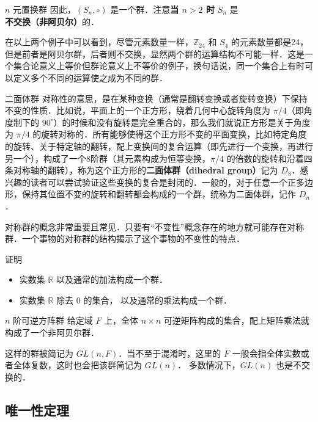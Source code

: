 \begin{example}{$n$ 元置换群}
因此，$(S_n, \circ)$ 是一个群．注意\textbf{当 $n>2$ 时} $S_n$ 是\textbf{不交换（非阿贝尔）}的．
\end{example}

在以上两个例子中可以看到，尽管元素数量一样，$\mathbb{Z}_{24}$ 和 $S_4$ 的元素数量都是24，但是前者是阿贝尔群，后者则不交换，显然两个群的运算结构不可能一样．这是一个集合论意义上等价但群论意义上不等价的例子，换句话说，同一个集合上有时可以定义多个不同的运算使之成为不同的群．

\begin{example}{二面体群}\label{Group_ex4}
对称性的意思，是在某种变换（通常是翻转变换或者旋转变换）下保持不变的性质．比如说，平面上的一个正方形，绕着几何中心旋转角度为 $\pi/4$（即角度制下的 $90^\circ$）的时候和没有旋转是完全重合的，那么我们就说正方形是关于角度为 $\pi/4$ 的旋转对称的．所有能够使得这个正方形不变的平面变换，比如特定角度的旋转、关于特定轴的翻转，配上变换间的复合运算（即先进行一个变换，再进行另一个），构成了一个8阶群（其元素构成为恒等变换，$\pi/4$ 的倍数的旋转和沿着四条对称轴的翻转），称为这个正方形的\textbf{二面体群（dihedral group）}记为 $D_8$．感兴趣的读者可以尝试验证这些变换的复合是封闭的．一般的，对于任意一个正多边形，保持其位置不变的旋转和翻转都会构成的一个群，统称为二面体群，记作 $D_n$．
\end{example}
对称群的概念非常重要且常见．只要有“不变性”概念存在的地方就可能存在对称群．一个事物的对称群的结构揭示了这个事物的不变性的特点．

\begin{exercise}{}
证明
\begin{itemize}
\item 实数集 $\mathbb R$ 以及通常的加法构成一个群．
\item 实数集 $\mathbb R$ 除去 $0$ 的集合， 以及通常的乘法构成一个群．
\end{itemize}
\end{exercise}

\begin{example}{$n$ 阶可逆方阵群}\label{Group_ex5}
给定域 $F$ 上，全体 $n\times n$ 可逆矩阵构成的集合，配上矩阵乘法就构成了一个非阿贝尔群．%

这样的群被简记为 $GL(n, F)$．当不至于混淆时，这里的 $F$ 一般会指全体实数或者全体复数，这时也会把该群简记为 $GL(n)$． 多数情况下，$GL(n)$ 也是不交换的．
\end{example}

\subsection{唯一性定理}

